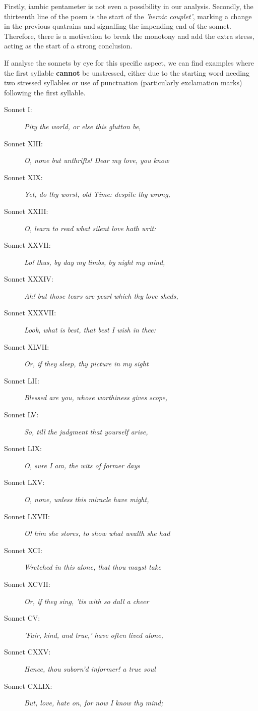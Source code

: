 \begin{description}
Firstly, iambic pentameter is not even a possibility in our analysis. Secondly, the thirteenth line of the poem is the start of the \textit{'heroic couplet'}, marking a change in the previous quatrains and signalling the impending end of the sonnet. Therefore, there is a motivation to break the monotony and add the extra stress, acting as the start of a strong conclusion.

If analyse the sonnets by eye for this specific aspect, we can find examples where the first syllable \textbf{cannot} be unstressed, either due to the starting word needing two stressed syllables or use of punctuation (particularly exclamation marks) following the first syllable.

\begin{description}
\item[Sonnet I: ] \textit{Pity the world, or else this glutton be,}
\item[Sonnet XIII: ] \textit{O, none but unthrifts! Dear my love, you know}
\item[Sonnet XIX: ] \textit{Yet, do thy worst, old Time: despite thy wrong,}
\item[Sonnet XXIII: ] \textit{O, learn to read what silent love hath writ:}
\item[Sonnet XXVII: ] \textit{Lo! thus, by day my limbs, by night my mind,}
\item[Sonnet XXXIV: ] \textit{Ah! but those tears are pearl which thy love sheds,}
\item[Sonnet XXXVII: ] \textit{Look, what is best, that best I wish in thee:}
\item[Sonnet XLVII: ] \textit{Or, if they sleep, thy picture in my sight}
\item[Sonnet LII: ] \textit{Blessed are you, whose worthiness gives scope,}
\item[Sonnet LV: ] \textit{So, till the judgment that yourself arise,}
\item[Sonnet LIX: ] \textit{O, sure I am, the wits of former days}
\item[Sonnet LXV: ] \textit{O, none, unless this miracle have might,}
\item[Sonnet LXVII: ] \textit{O! him she stores, to show what wealth she had}
\item[Sonnet XCI: ] \textit{Wretched in this alone, that thou mayst take}
\item[Sonnet XCVII: ] \textit{Or, if they sing, 'tis with so dull a cheer}
\item[Sonnet CV: ] \textit{'Fair, kind, and true,' have often lived alone,}
\item[Sonnet CXXV: ] \textit{Hence, thou suborn'd informer! a true soul}
\item[Sonnet CXLIX: ] \textit{But, love, hate on, for now I know thy mind;}
\end{description}


\end{description}
